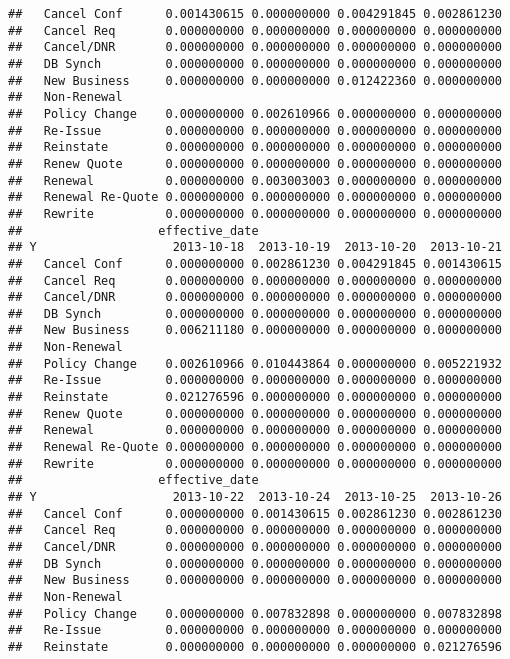 \documentclass[]{article}
\begin{document}
\begin{verbatim}
##   Cancel Conf      0.001430615 0.000000000 0.004291845 0.002861230
##   Cancel Req       0.000000000 0.000000000 0.000000000 0.000000000
##   Cancel/DNR       0.000000000 0.000000000 0.000000000 0.000000000
##   DB Synch         0.000000000 0.000000000 0.000000000 0.000000000
##   New Business     0.000000000 0.000000000 0.012422360 0.000000000
##   Non-Renewal                                                     
##   Policy Change    0.000000000 0.002610966 0.000000000 0.000000000
##   Re-Issue         0.000000000 0.000000000 0.000000000 0.000000000
##   Reinstate        0.000000000 0.000000000 0.000000000 0.000000000
##   Renew Quote      0.000000000 0.000000000 0.000000000 0.000000000
##   Renewal          0.000000000 0.003003003 0.000000000 0.000000000
##   Renewal Re-Quote 0.000000000 0.000000000 0.000000000 0.000000000
##   Rewrite          0.000000000 0.000000000 0.000000000 0.000000000
##                   effective_date
## Y                   2013-10-18  2013-10-19  2013-10-20  2013-10-21
##   Cancel Conf      0.000000000 0.002861230 0.004291845 0.001430615
##   Cancel Req       0.000000000 0.000000000 0.000000000 0.000000000
##   Cancel/DNR       0.000000000 0.000000000 0.000000000 0.000000000
##   DB Synch         0.000000000 0.000000000 0.000000000 0.000000000
##   New Business     0.006211180 0.000000000 0.000000000 0.000000000
##   Non-Renewal                                                     
##   Policy Change    0.002610966 0.010443864 0.000000000 0.005221932
##   Re-Issue         0.000000000 0.000000000 0.000000000 0.000000000
##   Reinstate        0.021276596 0.000000000 0.000000000 0.000000000
##   Renew Quote      0.000000000 0.000000000 0.000000000 0.000000000
##   Renewal          0.000000000 0.000000000 0.000000000 0.000000000
##   Renewal Re-Quote 0.000000000 0.000000000 0.000000000 0.000000000
##   Rewrite          0.000000000 0.000000000 0.000000000 0.000000000
##                   effective_date
## Y                   2013-10-22  2013-10-24  2013-10-25  2013-10-26
##   Cancel Conf      0.000000000 0.001430615 0.002861230 0.002861230
##   Cancel Req       0.000000000 0.000000000 0.000000000 0.000000000
##   Cancel/DNR       0.000000000 0.000000000 0.000000000 0.000000000
##   DB Synch         0.000000000 0.000000000 0.000000000 0.000000000
##   New Business     0.000000000 0.000000000 0.000000000 0.000000000
##   Non-Renewal                                                     
##   Policy Change    0.000000000 0.007832898 0.000000000 0.007832898
##   Re-Issue         0.000000000 0.000000000 0.000000000 0.000000000
##   Reinstate        0.000000000 0.000000000 0.000000000 0.021276596

\end{verbatim}
\end{document}
